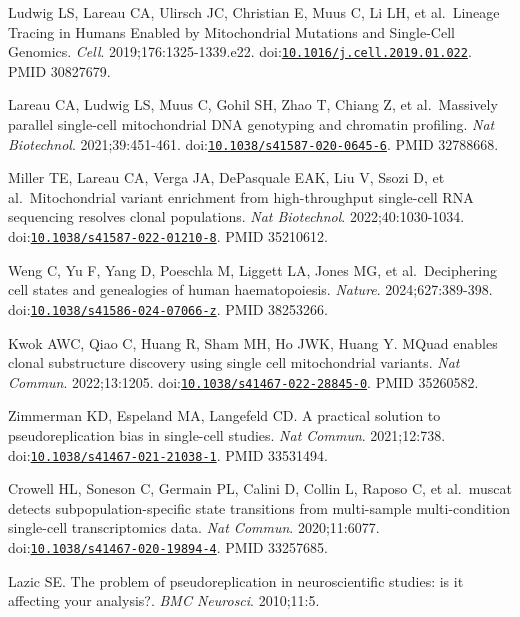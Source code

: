 \documentclass[11pt]{article}
\begin{document}
\begin{enumerate}[label={[\arabic*]},leftmargin=2.6em,labelsep=0.5em,itemsep=1.5pt]
  Ludwig LS, Lareau CA, Ulirsch JC, Christian E, Muus C, Li LH, et
  al.~Lineage Tracing in Humans Enabled by Mitochondrial Mutations and
  Single-Cell Genomics. \emph{Cell}. 2019;176:1325-1339.e22.
  doi:\href{https://doi.org/10.1016/j.cell.2019.01.022}{\nolinkurl{10.1016/j.cell.2019.01.022}}.
  PMID 30827679.
\item
  Lareau CA, Ludwig LS, Muus C, Gohil SH, Zhao T, Chiang Z, et
  al.~Massively parallel single-cell mitochondrial DNA genotyping and
  chromatin profiling. \emph{Nat Biotechnol}. 2021;39:451-461.
  doi:\href{https://doi.org/10.1038/s41587-020-0645-6}{\nolinkurl{10.1038/s41587-020-0645-6}}.
  PMID 32788668.
\item
  Miller TE, Lareau CA, Verga JA, DePasquale EAK, Liu V, Ssozi D, et
  al.~Mitochondrial variant enrichment from high-throughput single-cell
  RNA sequencing resolves clonal populations. \emph{Nat Biotechnol}.
  2022;40:1030-1034.
  doi:\href{https://doi.org/10.1038/s41587-022-01210-8}{\nolinkurl{10.1038/s41587-022-01210-8}}.
  PMID 35210612.
\item
  Weng C, Yu F, Yang D, Poeschla M, Liggett LA, Jones MG, et
  al.~Deciphering cell states and genealogies of human haematopoiesis.
  \emph{Nature}. 2024;627:389-398.
  doi:\href{https://doi.org/10.1038/s41586-024-07066-z}{\nolinkurl{10.1038/s41586-024-07066-z}}.
  PMID 38253266.
\item
  Kwok AWC, Qiao C, Huang R, Sham MH, Ho JWK, Huang Y. MQuad enables
  clonal substructure discovery using single cell mitochondrial
  variants. \emph{Nat Commun}. 2022;13:1205.
  doi:\href{https://doi.org/10.1038/s41467-022-28845-0}{\nolinkurl{10.1038/s41467-022-28845-0}}.
  PMID 35260582.
\item
  Zimmerman KD, Espeland MA, Langefeld CD. A practical solution to
  pseudoreplication bias in single-cell studies. \emph{Nat Commun}.
  2021;12:738.
  doi:\href{https://doi.org/10.1038/s41467-021-21038-1}{\nolinkurl{10.1038/s41467-021-21038-1}}.
  PMID 33531494.
\item
  Crowell HL, Soneson C, Germain PL, Calini D, Collin L, Raposo C, et
  al.~muscat detects subpopulation-specific state transitions from
  multi-sample multi-condition single-cell transcriptomics data.
  \emph{Nat Commun}. 2020;11:6077.
  doi:\href{https://doi.org/10.1038/s41467-020-19894-4}{\nolinkurl{10.1038/s41467-020-19894-4}}.
  PMID 33257685.
\item
  Lazic SE. The problem of pseudoreplication in neuroscientific studies:
  is it affecting your analysis?. \emph{BMC Neurosci}. 2010;11:5.

\end{enumerate}
\end{document}
